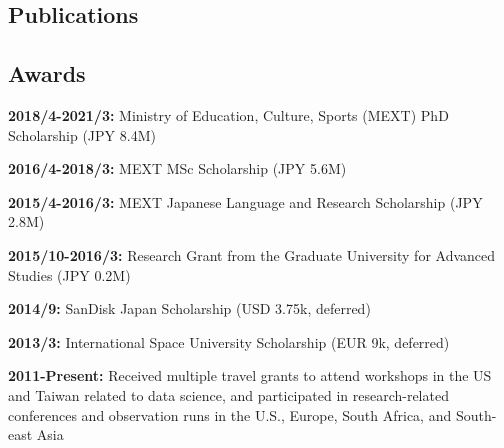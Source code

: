 \documentclass[12pt,letterpaper]{article}
\begin{document}
\ifdefined\withpubs
  \subsection{Publications}
  
  \begin{list}{}{\cvlist}
    
  \end{list}

\fi

\subsection{Awards}
\begin{list}{}{\cvlist}
    \item \textbf{2018/4-2021/3:} Ministry of Education, Culture, Sports (MEXT) PhD Scholarship (JPY 8.4M)
    \item \textbf{2016/4-2018/3:} MEXT MSc Scholarship (JPY 5.6M)
    \item \textbf{2015/4-2016/3:} MEXT Japanese Language and Research Scholarship (JPY 2.8M)
    \item \textbf{2015/10-2016/3:} Research Grant from the Graduate University for Advanced Studies (JPY 0.2M)
    \item \textbf{2014/9:} SanDisk Japan Scholarship (USD 3.75k, deferred)
    \item \textbf{2013/3:} International Space University Scholarship (EUR 9k, deferred)
    \item \textbf{2011-Present:} Received multiple travel grants to attend workshops in the US and Taiwan related to data science, and participated in research-related conferences and observation runs in the U.S., Europe, South Africa, and South-east Asia
\end{list}
\end{document}
